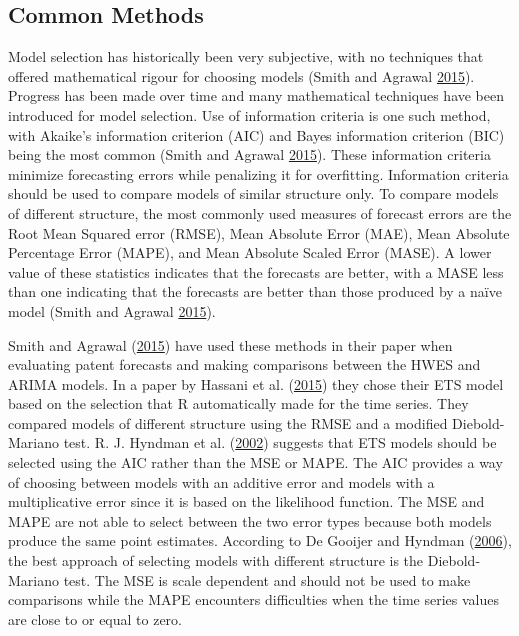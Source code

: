 \documentclass[12pt,preprint, authoryear]{elsarticle}
\numberwithin{equation}{section}
\numberwithin{figure}{section}
\numberwithin{table}{section}
\begin{document}
\subsection{Common Methods}\label{common-methods}

Model selection has historically been very subjective, with no
techniques that offered mathematical rigour for choosing models (Smith
and Agrawal \protect\hyperlink{ref-smith2015comparison}{2015}). Progress
has been made over time and many mathematical techniques have been
introduced for model selection. Use of information criteria is one such
method, with Akaike's information criterion (AIC) and Bayes information
criterion (BIC) being the most common (Smith and Agrawal
\protect\hyperlink{ref-smith2015comparison}{2015}). These information
criteria minimize forecasting errors while penalizing it for
overfitting. Information criteria should be used to compare models of
similar structure only. To compare models of different structure, the
most commonly used measures of forecast errors are the Root Mean Squared
error (RMSE), Mean Absolute Error (MAE), Mean Absolute Percentage Error
(MAPE), and Mean Absolute Scaled Error (MASE). A lower value of these
statistics indicates that the forecasts are better, with a MASE less
than one indicating that the forecasts are better than those produced by
a naïve model (Smith and Agrawal
\protect\hyperlink{ref-smith2015comparison}{2015}).

Smith and Agrawal (\protect\hyperlink{ref-smith2015comparison}{2015})
have used these methods in their paper when evaluating patent forecasts
and making comparisons between the HWES and ARIMA models. In a paper by
Hassani et al. (\protect\hyperlink{ref-hassani2015forecasting}{2015})
they chose their ETS model based on the selection that R automatically
made for the time series. They compared models of different structure
using the RMSE and a modified Diebold-Mariano test. R. J. Hyndman et al.
(\protect\hyperlink{ref-hyndman2002state}{2002}) suggests that ETS
models should be selected using the AIC rather than the MSE or MAPE. The
AIC provides a way of choosing between models with an additive error and
models with a multiplicative error since it is based on the likelihood
function. The MSE and MAPE are not able to select between the two error
types because both models produce the same point estimates. According to
De Gooijer and Hyndman (\protect\hyperlink{ref-de200625}{2006}), the
best approach of selecting models with different structure is the
Diebold-Mariano test. The MSE is scale dependent and should not be used
to make comparisons while the MAPE encounters difficulties when the time
series values are close to or equal to zero.
\end{document}
